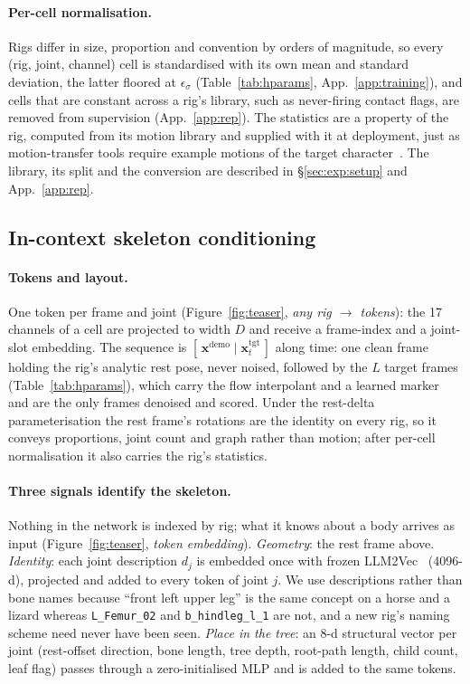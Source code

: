 \paragraph{Per-cell normalisation.} Rigs differ in size, proportion and convention by orders of
magnitude, so every (rig, joint, channel) cell is standardised with its own mean and standard
deviation, the latter floored at $\epsilon_\sigma$ (Table~\ref{tab:hparams}, App.~\ref{app:training}), and cells that are constant across
a rig's library, such as never-firing contact flags, are removed from supervision (App.~\ref{app:rep}). The
statistics are a property of the rig, computed from its motion library and supplied with it at deployment,
just as motion-transfer tools require example motions of the target
character~\citep{chen2025motion2motion}. The library, its split and the conversion are described in
\S\ref{sec:exp:setup} and App.~\ref{app:rep}.

\subsection{In-context skeleton conditioning}\label{sec:method:model}

\paragraph{Tokens and layout.} One token per frame and joint (Figure~\ref{fig:teaser}, \emph{any rig
$\to$ tokens}): the 17 channels of a cell are projected to width $D$ and receive a frame-index and a
joint-slot embedding. The sequence is $[\,\mathbf{x}^{\mathrm{demo}}\mid\mathbf{x}_t^{\mathrm{tgt}}\,]$
along time: one clean frame holding the rig's analytic rest pose, never noised, followed by the $L$
target frames (Table~\ref{tab:hparams}), which carry the flow interpolant and a learned marker and are the
only frames denoised and scored. Under the rest-delta parameterisation the rest frame's rotations are the identity
on every rig, so it conveys proportions, joint count and graph rather than motion; after per-cell
normalisation it also carries the rig's statistics.

\paragraph{Three signals identify the skeleton.} Nothing in the network is indexed by rig; what it knows
about a body arrives as input (Figure~\ref{fig:teaser}, \emph{token embedding}). \emph{Geometry}: the
rest frame above. \emph{Identity}: each joint description $d_j$ is embedded once with frozen
LLM2Vec~\citep{behnamghader2024llm2vec} (4096-d), projected and added to every token of joint $j$.
We use descriptions rather than bone names because ``front left upper leg'' is the same concept on a horse
and a lizard whereas \texttt{L\_Femur\_02} and \texttt{b\_hindleg\_l\_1} are not, and a new rig's
naming scheme need never have been seen. \emph{Place in the tree}: an 8-d structural vector per joint
(rest-offset direction, bone length, tree depth, root-path length, child count, leaf flag) passes
through a zero-initialised MLP and is added to the same tokens.

